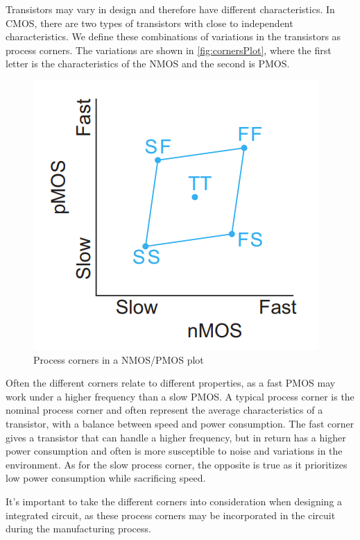 Transistors may vary in design and therefore have different characteristics. In CMOS, there are two types of transistors with close to independent characteristics. We define these combinations of variations in the transistors as process corners. The variations are shown in \autoref{fig:cornersPlot}, where the first letter is the characteristics of the NMOS and the second is PMOS. 

\begin{figure}[H]
    \centering
    \includegraphics{Figures/CornersTheory.png}
    \caption{Process corners in a NMOS/PMOS plot \cite[p.245]{CMOS_VLSI_design}}
    \label{fig:cornersPlot}
\end{figure}

Often the different corners relate to different properties, as a fast PMOS may work under a higher frequency than a slow PMOS. A typical process corner is the nominal process corner and often represent the average characteristics of a transistor, with a balance between speed and power consumption. The fast corner gives a transistor that can handle a higher frequency, but in return has a higher power consumption and often is more susceptible to noise and variations in the environment. As for the slow process corner, the opposite is true as it prioritizes low power consumption while sacrificing speed.

It's important to take the different corners into consideration when designing a integrated circuit, as these process corners may be incorporated in the circuit during the manufacturing process. 

